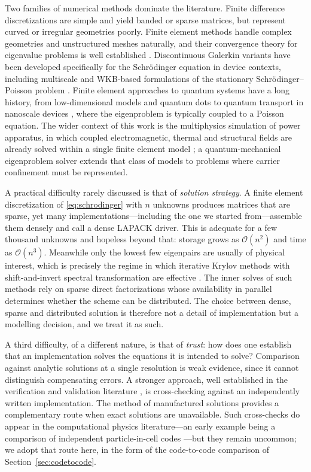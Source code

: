 \documentclass[pdflatex,sn-mathphys-num]{sn-jnl}
\theoremstyle{thmstyleone}%
\theoremstyle{thmstyletwo}%
\theoremstyle{thmstylethree}%
\begin{document}
Two families of numerical methods dominate the literature. Finite difference
discretizations are simple and yield banded or sparse matrices, but represent
curved or irregular geometries poorly. Finite element methods handle complex
geometries and unstructured meshes naturally, and their convergence theory for
eigenvalue problems is well established
\cite{strang1973,babuska1991,boffi2010}. Discontinuous Galerkin
variants have been developed specifically for the Schr\"odinger equation in
device contexts, including multiscale and WKB-based formulations of the
stationary Schr\"odinger--Poisson problem \cite{wang2009,negulescu2008}. Finite
element approaches to quantum systems have a long history, from
low-dimensional models and quantum dots \cite{malvezzi2003,caruso2019} to
quantum transport in nanoscale devices \cite{datta2005,rammohan2002}, where the
eigenproblem is typically coupled to a Poisson equation. The wider context of this work is the multiphysics simulation of power
apparatus, in which coupled electromagnetic, thermal and structural fields are
already solved within a single finite element model \cite{sousa2021}; a
quantum-mechanical eigenproblem solver extends that class of models to problems
where carrier confinement must be represented.

A practical difficulty rarely discussed is that of \emph{solution strategy}. A
finite element discretization of \eqref{eq:schrodinger} with $n$ unknowns
produces matrices that are sparse, yet many implementations---including the one
we started from---assemble them densely and call a dense LAPACK driver. This is
adequate for a few thousand unknowns and hopeless beyond that: storage grows as
$\mathcal{O}(n^2)$ and time as $\mathcal{O}(n^3)$. Meanwhile only the lowest few
eigenpairs are usually of physical interest, which is precisely the regime in
which iterative Krylov methods with shift-and-invert spectral transformation are
effective \cite{lehoucq1998,saad2011}. The inner solves of such methods rely on
sparse direct factorizations \cite{davis2006} whose availability in parallel
determines whether the scheme can be distributed. The choice between dense,
sparse and distributed solution is therefore not a detail of implementation but
a modelling decision, and we treat it as such.

A third difficulty, of a different nature, is that of \emph{trust}: how does one
establish that an implementation solves the equations it is intended to solve?
Comparison against analytic solutions at a single resolution is weak evidence,
since it cannot distinguish compensating errors. A stronger approach, well
established in the verification and validation literature
\cite{oberkampf2010,roache1998}, is cross-checking against an
independently written implementation. The method of manufactured solutions
\cite{salari2000,mms2017} provides a complementary route when exact solutions are
unavailable. Such cross-checks do appear in the computational physics
literature---an early example being a comparison of independent
particle-in-cell codes \cite{paes2003}---but they remain uncommon; we adopt that
route here, in the form of the code-to-code comparison of
Section~\ref{sec:codetocode}.
\end{document}
